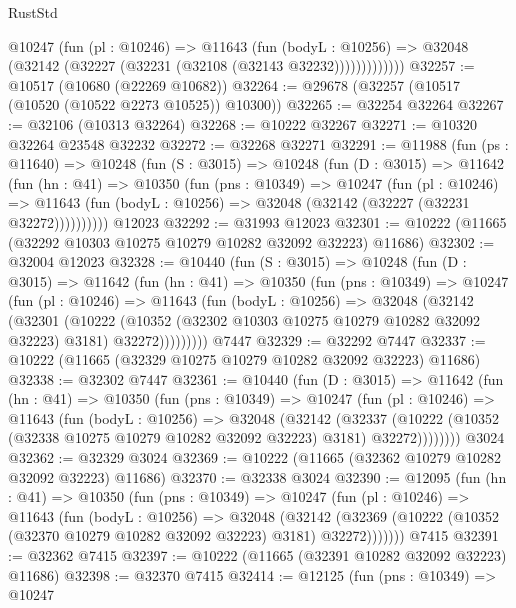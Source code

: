 \begin{lexlean}{RustStd}
\begin{coremodule}
              @10247
                (fun (pl : @10246) =>
                @11643
                  (fun (bodyL : @10256) =>
                  @32048 (@32142 (@32227 (@32231 (@32108 (@32143 @32232)))))))))))))
@32257 := @10517 (@10680 (@22269 @10682))
@32264 := @29678 (@32257 (@10517 (@10520 (@10522 @2273 @10525)) @10300))
@32265 := @32254 @32264
@32267 := @32106 (@10313 @32264)
@32268 := @10222 @32267
@32271 := @10320 @32264 @23548 @32232
@32272 := @32268 @32271
@32291 := @11988
    (fun (ps : @11640) =>
    @10248
      (fun (S : @3015) =>
      @10248
        (fun (D : @3015) =>
        @11642
          (fun (hn : @41) =>
          @10350
            (fun (pns : @10349) =>
            @10247
              (fun (pl : @10246) =>
              @11643 (fun (bodyL : @10256) => @32048 (@32142 (@32227 (@32231 @32272))))))))))
    @12023
@32292 := @31993 @12023
@32301 := @10222 (@11665 (@32292 @10303 @10275 @10279 @10282 @32092 @32223) @11686)
@32302 := @32004 @12023
@32328 := @10440
    (fun (S : @3015) =>
    @10248
      (fun (D : @3015) =>
      @11642
        (fun (hn : @41) =>
        @10350
          (fun (pns : @10349) =>
          @10247
            (fun (pl : @10246) =>
            @11643
              (fun (bodyL : @10256) =>
              @32048
                (@32142
                  (@32301
                    (@10222
                      (@10352 (@32302 @10303 @10275 @10279 @10282 @32092 @32223) @3181)
                      @32272)))))))))
    @7447
@32329 := @32292 @7447
@32337 := @10222 (@11665 (@32329 @10275 @10279 @10282 @32092 @32223) @11686)
@32338 := @32302 @7447
@32361 := @10440
    (fun (D : @3015) =>
    @11642
      (fun (hn : @41) =>
      @10350
        (fun (pns : @10349) =>
        @10247
          (fun (pl : @10246) =>
          @11643
            (fun (bodyL : @10256) =>
            @32048
              (@32142
                (@32337
                  (@10222 (@10352 (@32338 @10275 @10279 @10282 @32092 @32223) @3181) @32272))))))))
    @3024
@32362 := @32329 @3024
@32369 := @10222 (@11665 (@32362 @10279 @10282 @32092 @32223) @11686)
@32370 := @32338 @3024
@32390 := @12095
    (fun (hn : @41) =>
    @10350
      (fun (pns : @10349) =>
      @10247
        (fun (pl : @10246) =>
        @11643
          (fun (bodyL : @10256) =>
          @32048
            (@32142
              (@32369 (@10222 (@10352 (@32370 @10279 @10282 @32092 @32223) @3181) @32272)))))))
    @7415
@32391 := @32362 @7415
@32397 := @10222 (@11665 (@32391 @10282 @32092 @32223) @11686)
@32398 := @32370 @7415
@32414 := @12125
    (fun (pns : @10349) =>
    @10247

\end{coremodule}
\end{lexlean}
